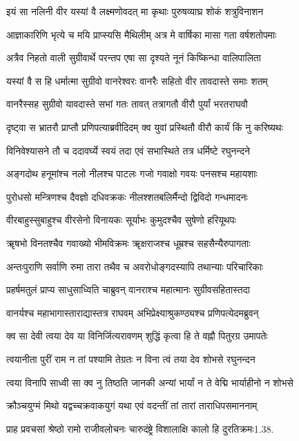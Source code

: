 \twolineshloka
{इयं सा नलिनी वीर यस्यां वै लक्ष्मणोवदत्}
{मा कृथाः पुरुषव्याघ्र शोकं शत्रुविनाशन}%

\twolineshloka
{आज्ञाकारिणि भृत्ये च मयि प्राप्स्यसि मैथिलीम्}
{अत्र मे वार्षिका मासा गता वर्षशतोपमाः}%

\twolineshloka
{अत्रैव निहतो वाली सुग्रीवार्थे परन्तप}
{एषा सा दृश्यते नूनं किष्किन्धा वालिपालिता}%

\twolineshloka
{यस्यां वै स हि धर्मात्मा सुग्रीवो वानरेश्वरः}
{वानरैः सहितो वीर तावदास्ते समाः शतम्}%

\twolineshloka
{वानरैस्सह सुग्रीवो यावदास्ते सभां गतः}
{तावत् तत्रागतौ वीरौ पुर्यां भरतराघवौ}%

\twolineshloka
{दृष्ट्वा स भ्रातरौ प्राप्तौ प्रणिपत्याब्रवीदिदम्}
{क्व युवां प्रस्थितौ वीरौ कार्यं किं नु करिष्यथः}%

\twolineshloka
{विनिवेश्यासने तौ च ददावर्घ्ये स्वयं तदा}
{एवं सभास्थिते तत्र धर्मिष्टे रघुनन्दने}%

\twolineshloka
{अङ्गदोथ हनूमांश्च नलो नीलश्च पाटलः}
{गजो गवाक्षो गवयः पनसश्च महायशाः}%

\twolineshloka
{पुरोधसो मन्त्रिणश्च दैवज्ञो दधिवक्रकः}
{नीलश्शतबलिर्मैन्दो द्विविदो गन्धमादनः}%

\twolineshloka
{वीरबाहुस्सुबाहुश्च वीरसेनो विनायकः}
{सूर्याभः कुमुदश्चैव सुषेणो हरियूथपः}%

\twolineshloka
{ॠषभो विनतश्चैव गवाख्यो भीमविक्रमः}
{ॠक्षराजश्च धूम्रश्च सहसैन्यैरुपागताः}%

\twolineshloka
{अन्तःपुराणि सर्वाणि रुमा तारा तथैव च}
{अवरोधोङ्गदस्यापि तथान्याः परिचारिकाः}%

\twolineshloka
{प्रहर्षमतुलं प्राप्य साधुसाध्विति चाब्रुवन्}
{वानराश्च महात्मानः सुग्रीवसहितास्तदा}%

\twolineshloka
{वानर्यश्च महाभागास्ताराद्यास्तत्र राघवम्}
{अभिप्रेक्ष्याश्रुकण्ठ्यश्च प्रणिपत्येदमब्रुवन्}%

\twolineshloka
{क्व सा देवी त्वया देव या विनिर्जित्यरावणम्}
{शुद्धिं कृत्वा हि ते वह्नौ पितुरग्र उमापतेः}%

\twolineshloka
{त्वयानीता पुरीं राम न तां पश्यामि तेग्रतः}
{न विना त्वं तया देव शोभसे रघुनन्दन}%

\twolineshloka
{त्वया विनापि साध्वी सा क्व नु तिष्ठति जानकी}
{अन्यां भार्यां न ते वेद्मि भार्याहीनो न शोभसे}%

\twolineshloka
{क्रौञ्चयुग्मं मिथो यद्वच्चक्रवाकयुगं यथा}
{एवं वदन्तीं तां तारां ताराधिपसमाननाम्}%

\twolineshloka
{प्राह प्रवचसां श्रेष्ठो रामो राजीवलोचनः}
{चारुदंष्ट्रे विशालाक्षि कालो हि दुरतिक्रमः1.38.}%

